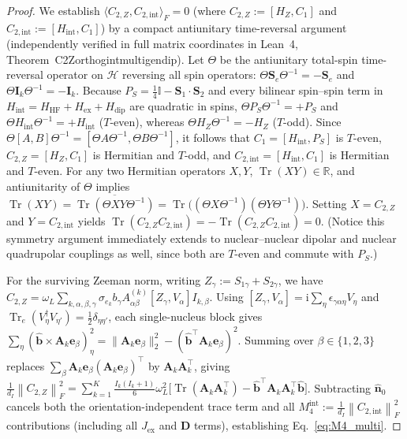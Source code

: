\documentclass[twocolumn,10pt,amsmath,amssymb,floatfix]{revtex4-2}
\theoremstyle{plain}
\theoremstyle{definition}
\newcommand{\ii}{\mathrm{i}}
\newcommand{\Tr}{\operatorname{Tr}}
\newcommand{\normF}[1]{\left\lVert #1 \right\rVert_F}
\newcommand{\PS}{P_S}
\newcommand{\HZ}{H_Z}
\newcommand{\HHF}{H_{\mathrm{HF}}}
\newcommand{\Hex}{H_{\mathrm{ex}}}
\newcommand{\Hdip}{H_{\mathrm{dip}}}
\newcommand{\leanid}[1]{{\footnotesize\ttfamily\def\_{\textunderscore\allowbreak}#1}}
\begin{document}
\begin{proof}
We establish $\langle C_{2,Z}, C_{2,\mathrm{int}}\rangle_F = 0$ (where $C_{2,Z} := [\HZ,C_1]$ and $C_{2,\mathrm{int}} := [H_{\mathrm{int}},C_1]$) by a compact antiunitary time-reversal argument (independently verified in full matrix coordinates in Lean~4, Theorem~\leanid{C2\_Z\_orthog\_int\_multi\_gen\_dip}). Let $\Theta$ be the antiunitary total-spin time-reversal operator on $\mathcal{H}$ reversing all spin operators: $\Theta \mathbf{S}_e \Theta^{-1} = -\mathbf{S}_e$ and $\Theta \mathbf{I}_k \Theta^{-1} = -\mathbf{I}_k$. Because $\PS = \frac{1}{4}\mathbb{I} - \mathbf{S}_1\cdot\mathbf{S}_2$ and every bilinear spin--spin term in $H_{\mathrm{int}} = \HHF + \Hex + \Hdip$ are quadratic in spins, $\Theta \PS \Theta^{-1} = +\PS$ and $\Theta H_{\mathrm{int}} \Theta^{-1} = +H_{\mathrm{int}}$ ($T$-even), whereas $\Theta \HZ \Theta^{-1} = -\HZ$ ($T$-odd). Since $\Theta[A,B]\Theta^{-1} = [\Theta A\Theta^{-1}, \Theta B\Theta^{-1}]$, it follows that $C_1 = [H_{\mathrm{int}},\PS]$ is $T$-even, $C_{2,Z} = [\HZ,C_1]$ is Hermitian and $T$-odd, and $C_{2,\mathrm{int}} = [H_{\mathrm{int}},C_1]$ is Hermitian and $T$-even. For any two Hermitian operators $X, Y$, $\Tr(XY) \in \mathbb{R}$, and antiunitarity of $\Theta$ implies $\Tr(XY) = \overline{\Tr(\Theta XY\Theta^{-1})} = \Tr\bigl((\Theta X\Theta^{-1})(\Theta Y\Theta^{-1})\bigr)$. Setting $X = C_{2,Z}$ and $Y = C_{2,\mathrm{int}}$ yields $\Tr(C_{2,Z} C_{2,\mathrm{int}}) = -\Tr(C_{2,Z} C_{2,\mathrm{int}}) = 0$. (Notice this symmetry argument immediately extends to nuclear--nuclear dipolar and nuclear quadrupolar couplings as well, since both are $T$-even and commute with $\PS$.)

For the surviving Zeeman norm, writing $Z_\gamma := S_{1\gamma}+S_{2\gamma}$, we have $C_{2,Z} = \omega_L \sum_{k,\alpha,\beta,\gamma} \sigma_{e_k} b_\gamma A^{(k)}_{\alpha\beta} [Z_\gamma, V_\alpha] I_{k,\beta}$. Using $[Z_\gamma, V_\alpha] = \ii \sum_\eta \epsilon_{\gamma\alpha\eta} V_\eta$ and $\Tr_e(V_\eta^\dagger V_{\eta'}) = \frac{1}{2}\delta_{\eta\eta'}$, each single-nucleus block gives $\sum_{\eta}(\hat{\mathbf{b}}\times \mathbf{A}_k \mathbf{e}_\beta)_\eta^2 = \|\mathbf{A}_k \mathbf{e}_\beta\|_2^2 - (\hat{\mathbf{b}}^\top \mathbf{A}_k \mathbf{e}_\beta)^2$. Summing over $\beta \in \{1,2,3\}$ replaces $\sum_\beta \mathbf{A}_k\mathbf{e}_\beta (\mathbf{A}_k\mathbf{e}_\beta)^\top$ by $\mathbf{A}_k \mathbf{A}_k^\top$, giving $\frac{1}{d_I}\normF{C_{2,Z}}^2 = \sum_{k=1}^K \frac{I_k(I_k+1)}{6}\omega_L^2\allowbreak\bigl[\Tr(\mathbf{A}_k\mathbf{A}_k^\top) - \hat{\mathbf{b}}^\top \mathbf{A}_k\mathbf{A}_k^\top\hat{\mathbf{b}}\bigr]$. Subtracting $\hat{\mathbf{n}}_0$ cancels both the orientation-independent trace term and all $M_4^{\mathrm{int}} := \frac{1}{d_I}\normF{C_{2,\mathrm{int}}}^2$ contributions (including all $J_{\mathrm{ex}}$ and $\mathbf{D}$ terms), establishing Eq.~\eqref{eq:M4_multi}.
\end{proof}
\end{document}
